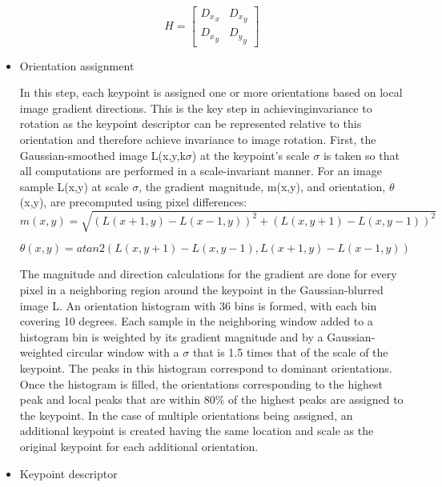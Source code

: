 \documentclass[12pt]{article}
\begin{document}
\begin{itemize}
$$H=\begin{bmatrix}
	{D_x}_x& {D_x}_y\\
	{D_x}_y& {D_y}_y
\end{bmatrix}$$
	
	\item Orientation assignment
	
	In this step, each keypoint is assigned one or more orientations based on local image gradient directions. This is the key step in achievinginvariance to rotation as the keypoint descriptor can be represented relative to this orientation and therefore achieve invariance to image rotation.
First, the Gaussian-smoothed image L(x,y,k$\sigma$) at the keypoint's scale $\sigma$ is taken so that all computations are performed in a scale-invariant manner. For an image sample L(x,y) at scale $\sigma$, the gradient magnitude, m(x,y), and orientation, $\theta$(x,y), are precomputed using pixel differences:
\begin{equation}
m(x,y)=\sqrt{(L(x+1,y)-L(x-1,y))^2+(L(x,y+1)-L(x,y-1))^2}
\end{equation}

\begin{equation}
\theta(x,y)=atan2(L(x,y+1)-L(x,y-1),L(x+1,y)-L(x-1,y))
\end{equation}

The magnitude and direction calculations for the gradient are done for every pixel in a neighboring region around the keypoint in the Gaussian-blurred image L. An orientation histogram with 36 bins is formed, with each bin covering 10 degrees. Each sample in the neighboring window added to a histogram bin is weighted by its gradient magnitude and by a Gaussian-weighted circular window with a $\sigma$ that is 1.5 times that of the scale of the keypoint. The peaks in this histogram correspond to dominant orientations. Once the histogram is filled, the orientations corresponding to the highest peak and local peaks that are within 80\% of the highest peaks are assigned to the keypoint. In the case of multiple orientations being assigned, an additional keypoint is created having the same location and scale as the original keypoint for each additional orientation.

	\item Keypoint descriptor


\end{itemize}
\end{document}
